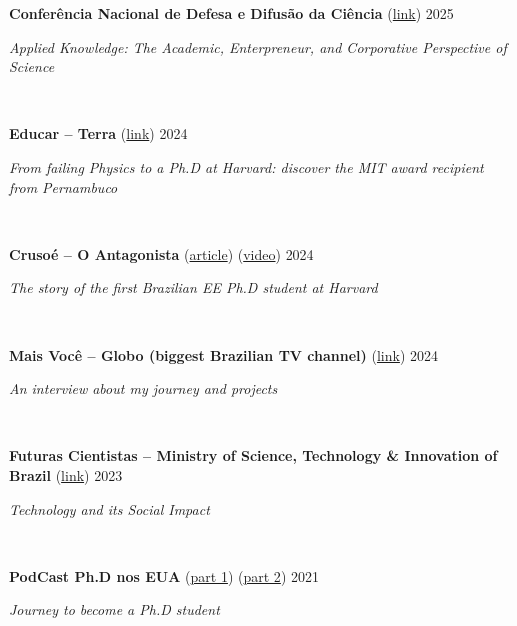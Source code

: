 \documentclass[letterpaper,10pt]{article}
\newcommand{\entry}[4]{

\begin{minipage}[t]{.15\textwidth}
\end{minipage}
\hfill\vline\hfill 
\begin{minipage}[t]{0.95\textwidth}
#2 \hfill \textsc{#1}

\textit{#3}

\footnotesize{#4}
\end{minipage}\\\vspace{.25cm}}
\begin{document}
\entry{2025}{\textbf{Conferência Nacional de Defesa e Difusão da Ciência} (\href{https://www.youtube.com/live/LHjNjV-f6q0?si=0vh8dLnf76PwcLZl&t=20177}{link})}{Applied Knowledge: The Academic, Enterpreneur, and Corporative Perspective of Science}{}

\entry{2024}{\textbf{Educar -- Terra} (\href{https://www.terra.com.br/noticias/educacao/da-recuperacao-em-fisica-ao-phd-em-harvard-conheca-a-historia-do-pernambucano-premiado-pelo-mit,3ed69c5460e41efbfe796dffdf6c47c4shi065se.html}{link})}{From failing Physics to a Ph.D at Harvard: discover the MIT award recipient from Pernambuco}{}

\entry{2024}{\textbf{Crusoé -- O Antagonista} (\href{https://crusoe.com.br/edicoes/325/a-historia-do-primeiro-brasileiro-phd-em-engenharia-em-harvard/}{article}) (\href{https://www.youtube.com/watch?v=wmis_W-EFKk}{video})}{The story of the first Brazilian EE Ph.D student at Harvard}{}

\entry{2024}{\textbf{Mais Você -- Globo (biggest Brazilian TV channel)} (\href{https://globoplay.globo.com/v/12673677/}{link})}{An interview about my journey and projects}{}

\entry{2023}{\textbf{Futuras Cientistas -- Ministry of Science, Technology \& Innovation of Brazil} (\href{https://www.youtube.com/watch?v=g5Inc6qXO6k&ab_channel=FuturasCientistas}{link})}{Technology and its Social Impact}{}

\entry{2021}{\textbf{PodCast Ph.D nos EUA} (\href{https://open.spotify.com/episode/37Rn34gdy7AxNgHeAvdIH0?si=11bf338624d04113}{part 1}) (\href{https://open.spotify.com/episode/7zYdb51lXeKbfpULOgpQlx?si=d1dbd10b9197486e}{part 2})}{Journey to become a Ph.D student}{}
\end{document}
